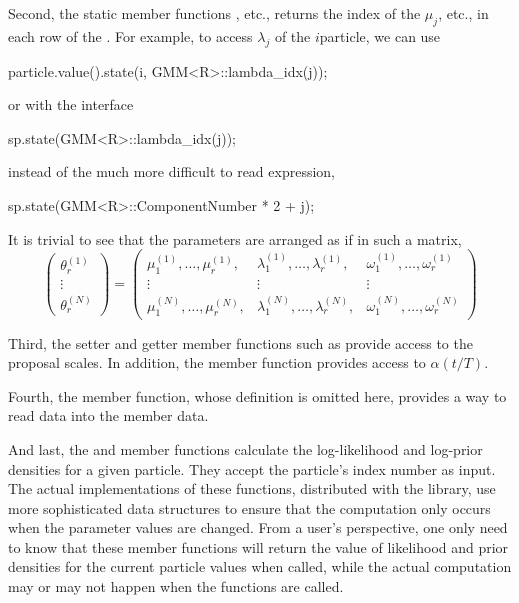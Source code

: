 Second, the static member functions , etc., returns the
index of the $\mu_j$, etc., in each row of the . For
example, to access $\lambda_j$ of the $i$\xth particle, we can use
\begin{cppcode}
particle.value().state(i, GMM<R>::lambda_idx(j));
\end{cppcode}
or with the  interface
\begin{cppcode}
sp.state(GMM<R>::lambda_idx(j));
\end{cppcode}
instead of the much more difficult to read expression,
\begin{cppcode}
sp.state(GMM<R>::ComponentNumber * 2 + j);
\end{cppcode}
It is trivial to see that the parameters are arranged as if in such a matrix,
\begin{equation*}
  \begin{pmatrix}
    \theta_r^{(1)} \\ \vdots \\ \theta_r^{(N)}
  \end{pmatrix} =
  \begin{pmatrix}
    \mu_1^{(1)},\dots,\mu_r^{(1)}, &
    \lambda_1^{(1)},\dots,\lambda_r^{(1)}, &
    \omega_1^{(1)},\dots,\omega_r^{(1)} \\
    \vdots & \vdots & \vdots \\
    \mu_1^{(N)},\dots,\mu_r^{(N)}, &
    \lambda_1^{(N)},\dots,\lambda_r^{(N)}, &
    \omega_1^{(N)},\dots,\omega_r^{(N)}
  \end{pmatrix}
\end{equation*}

Third, the setter and getter member functions such as 
provide access to the proposal scales. In addition, the member function
 provides access to $\alpha(t/T)$.

Fourth, the  member function, whose definition is omitted
here, provides a way to read data into the  member data.

And last, the  and  member
functions calculate the log-likelihood and log-prior densities for a given
particle. They accept the particle's index number as input. The actual
implementations of these functions, distributed with the library, use more
sophisticated data structures to ensure that the computation only occurs when
the parameter values are changed. From a user's perspective, one only need to
know that these member functions will return the value of likelihood and prior
densities for the current particle values when called, while the actual
computation may or may not happen when the functions are called.

